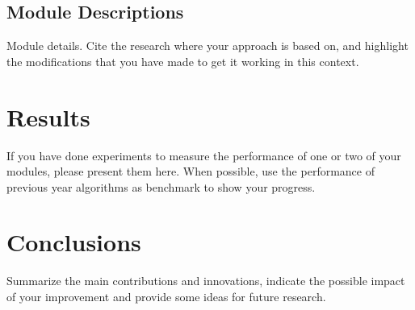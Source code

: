 \documentclass[runningheads,a4paper]{llncs}
\begin{document}
\subsection{Module Descriptions}
Module details. Cite the research where your approach is based on, and highlight the modifications that you have made to get it working in this context.
\section{Results}
If you have done experiments to measure the performance of one or two of your modules, please present them here. When possible, use the performance of previous year algorithms as benchmark to show your progress.
\section{Conclusions}
Summarize the main contributions and innovations, indicate the possible impact of your improvement and provide some ideas for future research.


\end{document}
